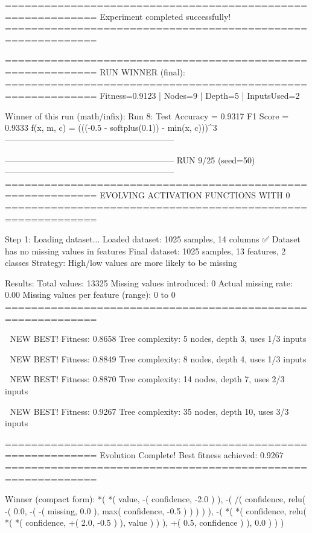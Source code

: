 ============================================================
Experiment completed successfully!
============================================================

============================================================
RUN WINNER (final):
============================================================
Fitness=0.9123 | Nodes=9 | Depth=5 | InputsUsed=2

Winner of this run (math/infix):
  Run 8:
     Test Accuracy = 0.9317
     F1 Score      = 0.9333
     f(x, m, c)    = (((-0.5 - softplus(0.1)) - min(x, c)))^3
------------------------------------------------------------

------------------------------------------------------------
RUN 9/25 (seed=50)
------------------------------------------------------------
============================================================
EVOLVING ACTIVATION FUNCTIONS
WITH 0%
============================================================

Step 1: Loading dataset...
Loaded dataset: 1025 samples, 14 columns
✅ Dataset has no missing values in features
Final dataset: 1025 samples, 13 features, 2 classes
Strategy: High/low values are more likely to be missing

Results:
  Total values: 13325
  Missing values introduced: 0
  Actual missing rate: 0.00%
  Missing values per feature (range): 0 to 0
============================================================


🎯 NEW BEST! Fitness: 0.8658
Tree complexity: 5 nodes, depth 3, uses 1/3 inputs

🎯 NEW BEST! Fitness: 0.8849
Tree complexity: 8 nodes, depth 4, uses 1/3 inputs

🎯 NEW BEST! Fitness: 0.8870
Tree complexity: 14 nodes, depth 7, uses 2/3 inputs

🎯 NEW BEST! Fitness: 0.9267
Tree complexity: 35 nodes, depth 10, uses 3/3 inputs

============================================================
Evolution Complete!
Best fitness achieved: 0.9267
============================================================

Winner (compact form):
 *(
  *(
    value,
    -(
      confidence,
      -2.0
    )
  ),
  -(
    /(
      confidence,
      relu(
        -(
          0.0,
          -(
            -(
              missing,
              0.0
            ),
            max(
              confidence,
              -0.5
            )
          )
        )
      )
    ),
    -(
      *(
        *(
          confidence,
          relu(
            *(
              *(
                confidence,
                +(
                  2.0,
                  -0.5
                )
              ),
              value
            )
          )
        ),
        +(
          0.5,
          confidence
        )
      ),
      0.0
    )
  )
)

